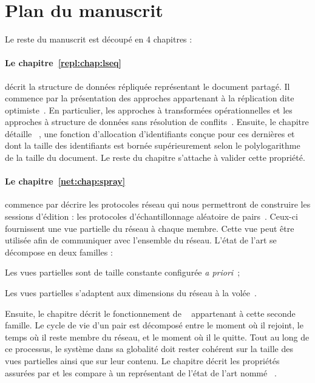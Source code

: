 
\section{Plan du manuscrit}

Le reste du manuscrit est découpé en 4 chapitres :

\paragraph{Le chapitre~\ref{repl:chap:lseq}} décrit la structure de données
répliquée représentant le document partagé. Il commence par la présentation des
approches appartenant à la réplication dite optimiste~\cite{demers1987epidemic,
  saito2005optimistic}. En particulier, les approches à transformées
opérationnelles et les approches à structure de données sans résolution de
conflits~\cite{burckhardt2014replicated, shapiro2011conflict}. Ensuite, le
chapitre détaille \LSEQ~\cite{nedelec2013concurrency, nedelec2013lseq}, une
fonction d'allocation d'identifiants conçue pour ces dernières et dont la taille
des identifiants est bornée supérieurement selon le polylogarithme de la taille
du document. Le reste du chapitre s'attache à valider cette propriété.

\paragraph{Le chapitre~\ref{net:chap:spray}} commence par décrire les protocoles
réseau qui nous permettront de construire les sessions d'édition : les
protocoles d'échantillonnage aléatoire de pairs~\cite{jelasity2004peer,
  jelasity2007gossip}. Ceux-ci fournissent une vue partielle du réseau à chaque
membre. Cette vue peut être utilisée afin de communiquer avec l'ensemble du
réseau. L'état de l'art se décompose en deux familles :
\begin{inparaenum}[(i)]
\item Les vues partielles sont de taille constante configurée \emph{a
    priori}~\cite{eugster2003lightweight, jelasity2007gossip,
    leitao2007dependable, tolgyeski2009adaptive, voulgaris2005cyclon};
\item Les vues partielles s'adaptent aux dimensions du réseau à la
  volée~\cite{ganesh2001scamp, ganesh2003peer}.
\end{inparaenum}
Ensuite, le chapitre décrit le fonctionnement de \SPRAY~\cite{nedelec2015spray}
appartenant à cette seconde famille. Le cycle de vie d'un pair est décomposé
entre le moment où il rejoint, le temps où il reste membre du réseau, et le
moment où il le quitte. Tout au long de ce processus, le système dans sa
globalité doit rester cohérent sur la taille des vues partielles ainsi que sur
leur contenu.  Le chapitre décrit les propriétés assurées par \SPRAY et les
compare à un représentant de l'état de l'art nommé
\CYCLON~\cite{voulgaris2005cyclon}.

